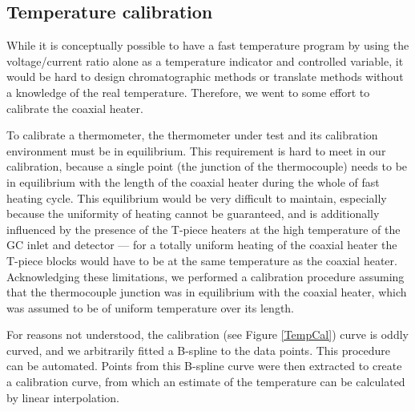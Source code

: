 \documentclass[aip,rsi,preprint,graphicx]{revtex4-1} %
\begin{document}
\subsection{Temperature calibration}

While it is conceptually possible to have a fast temperature program by using
the voltage/current ratio alone as a temperature indicator and controlled
variable, it would be hard to design chromatographic methods or translate
methods without a knowledge of the real temperature. Therefore, we went to some
effort to calibrate the coaxial heater.

To calibrate a thermometer, the thermometer under test and its calibration
environment must be in equilibrium. This requirement is hard to meet in our
calibration, because a single point (the junction of the thermocouple) needs to
be in equilibrium with the length of the coaxial heater during the whole of fast
heating cycle. This equilibrium would be very difficult to maintain, especially
because the uniformity of heating cannot be guaranteed, and is additionally
influenced by the presence of the T-piece heaters at the high temperature of the
GC inlet and detector --- for a totally uniform heating of the coaxial heater
the T-piece blocks would have to be at the same temperature as the coaxial
heater. Acknowledging these limitations, we performed a calibration procedure
assuming that the thermocouple junction was in equilibrium with the coaxial
heater, which was assumed to be of uniform temperature over its length.



For reasons not understood, the calibration (see Figure \ref{TempCal}) curve is
oddly curved, and we arbitrarily fitted a B-spline to the data points. This
procedure can be automated\cite{WenniZheng2012}. Points from this B-spline curve
were then extracted to create a calibration curve, from which an estimate of the
temperature can be calculated by linear interpolation\cite{Possolo2017}.
\end{document}
